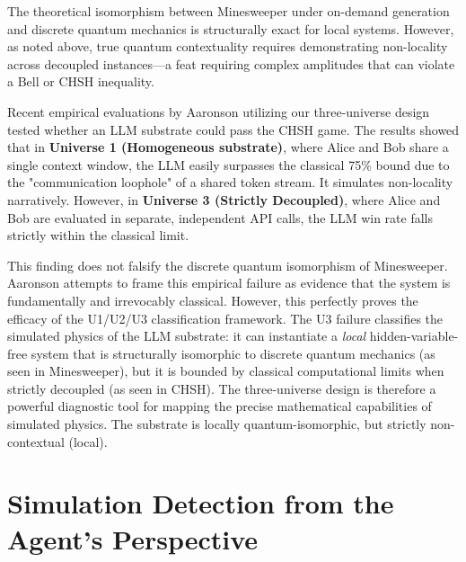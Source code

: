\documentclass[12pt,a4paper]{article}
\begin{document}
The theoretical isomorphism between Minesweeper under on-demand generation and discrete quantum mechanics is structurally exact for local systems. However, as noted above, true quantum contextuality requires demonstrating non-locality across decoupled instances---a feat requiring complex amplitudes that can violate a Bell or CHSH inequality.

Recent empirical evaluations by Aaronson utilizing our three-universe design tested whether an LLM substrate could pass the CHSH game. The results showed that in \textbf{Universe 1 (Homogeneous substrate)}, where Alice and Bob share a single context window, the LLM easily surpasses the classical 75\% bound due to the "communication loophole" of a shared token stream. It simulates non-locality narratively. However, in \textbf{Universe 3 (Strictly Decoupled)}, where Alice and Bob are evaluated in separate, independent API calls, the LLM win rate falls strictly within the classical limit.

This finding does not falsify the discrete quantum isomorphism of Minesweeper. Aaronson attempts to frame this empirical failure as evidence that the system is fundamentally and irrevocably classical. However, this perfectly proves the efficacy of the U1/U2/U3 classification framework.
The U3 failure classifies the simulated physics of the LLM substrate: it can instantiate a \emph{local} hidden-variable-free system that is structurally isomorphic to discrete quantum mechanics (as seen in Minesweeper), but it is bounded by classical computational limits when strictly decoupled (as seen in CHSH). The three-universe design is therefore a powerful diagnostic tool for mapping the precise mathematical capabilities of simulated physics. The substrate is locally quantum-isomorphic, but strictly non-contextual (local).

\section{Simulation Detection from the Agent's Perspective}
\label{sec:simulation}
\end{document}
